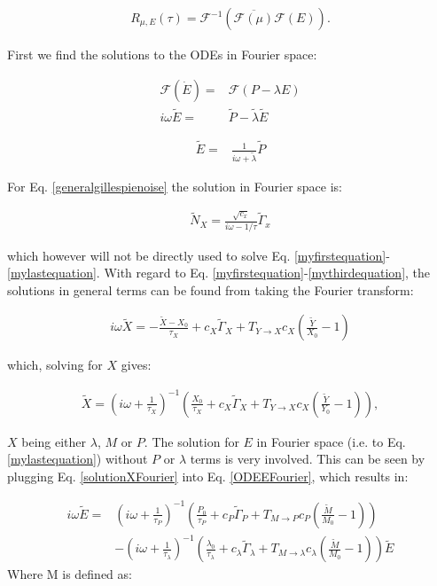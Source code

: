 \documentclass[a4paper,twoside,10pt]{report}
\begin{document}
\begin{align}
R_{\mu,E}(\tau) = \mathcal{F}^{-1} \left( \overline{\mathcal{F} (\mu)} \mathcal{F}(E) \right)
.
\end{align}

First we find the solutions to the ODEs in Fourier space:

\begin{align}
\label{ODEEFourier}
\mathcal{F} \left( \dot{E} \right) = & \mathcal{F} \left( P - \lambda E \right) \nonumber \\
%
i\omega \tilde{E} = & \tilde{P} - \tilde{\lambda} \tilde{E}
\end{align}

\begin{align}
 \tilde{E} = & \frac{1}{i\omega+\tilde{\lambda}} \tilde{P} 
\end{align}

For Eq. \ref{generalgillespienoise} the solution in Fourier space is:

\begin{align}
\tilde{N}_X = \frac{\sqrt{c_x}}{i\omega - 1/\tau} \tilde{\Gamma}_x
\end{align}

which however will not be directly used to solve Eq. \ref{myfirstequation}-\ref{mylastequation}. With regard to  Eq. \ref{myfirstequation}-\ref{mythirdequation}, the solutions in general terms can be found from taking the Fourier transform:

\begin{align}
i \omega \tilde{X} = - \frac{\tilde{X}-X_0}{\tau_X} + c_X \tilde{\Gamma}_X + T_{Y \rightarrow X} c_X (\frac{\tilde{Y}}{X_0} - 1)
\end{align}

which, solving for $X$ gives:

\begin{align}
\label{solutionXFourier}
\tilde{X} = \left( i \omega + \frac{1}{\tau_X} \right)^{-1} \left( \frac{X_0}{\tau_X} + c_X \tilde{\Gamma}_X + T_{Y \rightarrow X} c_X (\frac{\tilde{Y}}{Y_0} - 1) \right)
,
\end{align}

$X$ being either $\lambda$, $M$ or $P$.
%
The solution for $E$ in Fourier space (i.e. to Eq. \ref{mylastequation}) without $P$ or $\lambda$ terms is very involved. This can be seen by plugging Eq. \ref{solutionXFourier} into Eq. \ref{ODEEFourier}, which results in:

\begin{align}
\label{ODEEFourierExpanded}
i\omega \tilde{E} = & 
\left( i \omega + \frac{1}{\tau_P} \right)^{-1} \left( \frac{P_0}{\tau_P} + c_P \tilde{\Gamma}_P + T_{M \rightarrow P} c_P (\frac{\tilde{M}}{M_0} - 1) \right)
     \nonumber \\
    & -
    \left( i \omega + \frac{1}{\tau_\lambda} \right)^{-1} \left( \frac{\lambda_0}{\tau_\lambda} + c_\lambda \tilde{\Gamma}_\lambda + T_{M \rightarrow \lambda} c_\lambda (\frac{\tilde{M}}{M_0} - 1) \right)
     \tilde{E}
\end{align}
Where M is defined as:
\end{document}
